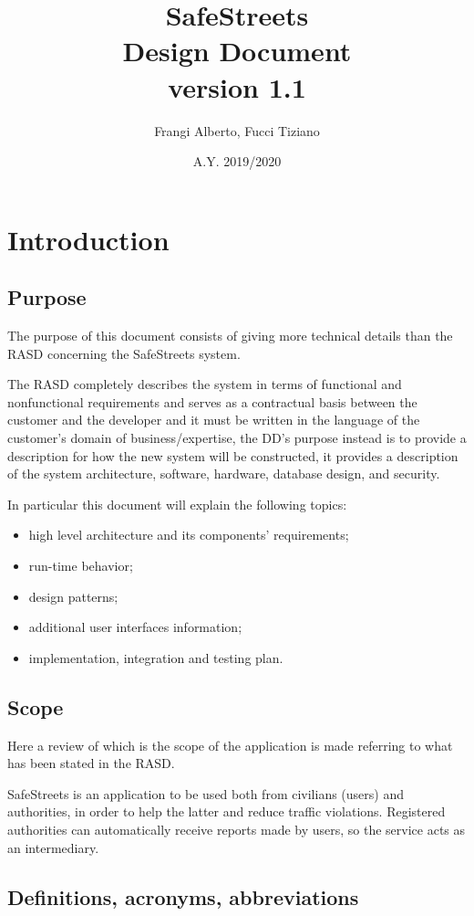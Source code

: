 \documentclass[12pt,a4paper]{report}
\title{SafeStreets \\ Design Document \\ \large version 1.1}
\author{Frangi Alberto, Fucci Tiziano}
\date{A.Y. 2019/2020}
\begin{document}
	\maketitle
	\tableofcontents
	\chapter{Introduction}
		\section{Purpose}
			The purpose of this document consists of giving more technical details than the RASD concerning the SafeStreets
			system.


			The RASD completely describes the system in terms of functional and nonfunctional requirements and
			serves as a contractual basis between the customer and the developer and it must be written in the language of
			the customer's domain of business/expertise, the DD's purpose instead is to provide a description for how the new
			system will be constructed, it provides a description of the system architecture, software, hardware, database
			design, and security.


			In particular this document will explain the following topics:
			\begin{itemize}
				\item high level architecture and its components' requirements;
				\item run-time behavior;
				\item design patterns;
				\item additional user interfaces information;
				\item implementation, integration and testing plan.
			\end{itemize}
		\section{Scope}
			Here a review of which is the scope of the application is made referring to what	has been stated in the RASD.


			SafeStreets is an application to be used both from civilians (users) and authorities, in order to help the latter and
			reduce traffic violations. Registered authorities can automatically receive reports made by users, so the service acts
			as an intermediary. 

		\section{Definitions, acronyms, abbreviations}
\end{document}
